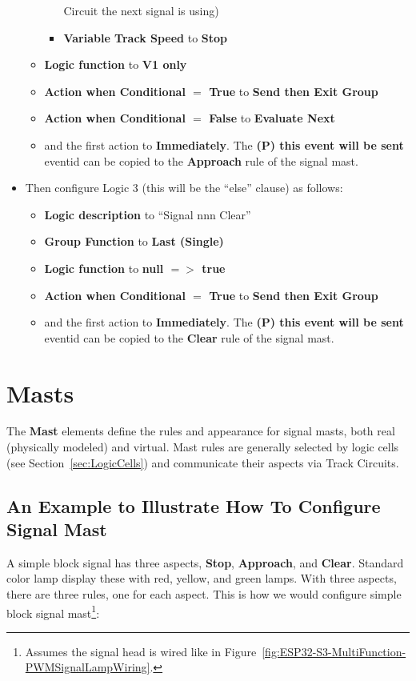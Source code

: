 \begin{itemize}
\begin{itemize}
\begin{itemize}
Circuit the next signal is using)
\item \textbf{Variable Track Speed} to \textbf{Stop}
\end{itemize}
\item \textbf{Logic function} to \textbf{V1 only}
\item \textbf{Action when Conditional $=$ True} to \textbf{Send then Exit 
Group}
\item \textbf{Action when Conditional $=$ False} to \textbf{Evaluate Next}
\item and the first action to \textbf{Immediately}.  The \textbf{(P) this 
event will be sent} eventid can be copied to the \textbf{Approach} rule of the 
signal mast.
\end{itemize}
\item Then configure Logic 3 (this will be the ``else'' clause) as follows:
\begin{itemize}
\item \textbf{Logic description} to ``Signal nnn Clear''
\item \textbf{Group Function} to \textbf{Last (Single)}
\item \textbf{Logic function} to \textbf{null $=>$ true}
\item \textbf{Action when Conditional $=$ True} to \textbf{Send then Exit
Group}
\item and the first action to \textbf{Immediately}.  The \textbf{(P) this 
event will be sent} eventid can be copied to the \textbf{Clear} rule of the 
signal mast.
\end{itemize}
\end{itemize}

\section{Masts}
\label{sec:Masts}

The \textbf{Mast} elements define the rules and appearance for signal masts, 
both real (physically modeled) and virtual.  Mast rules are generally selected 
by logic cells (see Section~\ref{sec:LogicCells}) and communicate their 
aspects via Track Circuits.

\subsection{An Example to Illustrate How To Configure Signal Mast}

A simple block signal has three aspects, \textbf{Stop}, \textbf{Approach}, and 
\textbf{Clear}. Standard color lamp display these with red, yellow, and green 
lamps.  With three aspects, there are three rules, one for each aspect.  This 
is how we would configure simple block signal mast\footnote{Assumes the signal 
head is wired like in 
Figure~\ref{fig:ESP32-S3-MultiFunction-PWMSignalLampWiring}.}:

